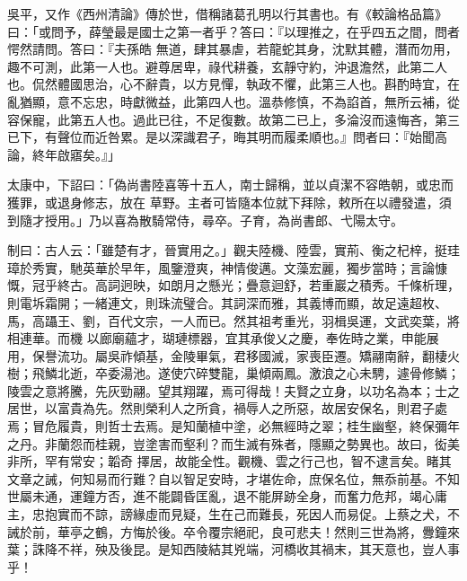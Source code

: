 \begin{pinyinscope}
 吳平，又作《西州清論》傳於世，借稱諸葛孔明以行其書也。有《較論格品篇》曰：「或問予，薛瑩最是國士之第一者乎？答曰：『以理推之，在乎四五之間，問者愕然請問。答曰：『夫孫皓
 無道，肆其暴虐，若龍蛇其身，沈默其體，潛而勿用，趣不可測，此第一人也。避尊居卑，祿代耕養，玄靜守約，沖退澹然，此第二人也。侃然體國思治，心不辭貴，以方見憚，執政不懼，此第三人也。斟酌時宜，在亂猶顯，意不忘忠，時獻微益，此第四人也。溫恭修慎，不為諂首，無所云補，從容保寵，此第五人也。過此已往，不足復數。故第二已上，多淪沒而遠悔吝，第三已下，有聲位而近咎累。是以深識君子，晦其明而履柔順也。』問者曰：『始聞高論，終年啟寤矣。』」



 太康中，下詔曰：「偽尚書陸喜等十五人，南士歸稱，並以貞潔不容皓朝，或忠而獲罪，或退身修志，放在
 草野。主者可皆隨本位就下拜除，敕所在以禮發遣，須到隨才授用。」乃以喜為散騎常侍，尋卒。子育，為尚書郎、弋陽太守。



 制曰：古人云：「雖楚有才，晉實用之。」觀夫陸機、陸雲，實荊、衡之杞梓，挺珪璋於秀實，馳英華於早年，風鑒澄爽，神情俊邁。文藻宏麗，獨步當時；言論慷慨，冠乎終古。高詞迥映，如朗月之懸光；疊意迴舒，若重巖之積秀。千條析理，則電坼霜開；一緒連文，則珠流璧合。其詞深而雅，其義博而顯，故足遠超枚、馬，高躡王、劉，百代文宗，一人而已。然其祖考重光，羽楫吳運，文武奕葉，將相連華。而機
 以廊廟蘊才，瑚璉標器，宜其承俊乂之慶，奉佐時之業，申能展用，保譽流功。屬吳祚傾基，金陵畢氣，君移國滅，家喪臣遷。矯翮南辭，翻棲火樹；飛鱗北逝，卒委湯池。遂使穴碎雙龍，巢傾兩鳳。激浪之心未騁，遽骨修鱗；陵雲之意將騰，先灰勁翮。望其翔躍，焉可得哉！夫賢之立身，以功名為本；士之居世，以富貴為先。然則榮利人之所貪，禍辱人之所惡，故居安保名，則君子處焉；冒危履貴，則哲士去焉。是知蘭植中塗，必無經時之翠；桂生幽壑，終保彌年之丹。非蘭怨而桂親，豈塗害而壑利？而生滅有殊者，隱顯之勢異也。故曰，衒美非所，罕有常安；韜奇
 擇居，故能全性。觀機、雲之行己也，智不逮言矣。睹其文章之誡，何知易而行難？自以智足安時，才堪佐命，庶保名位，無忝前基。不知世屬未通，運鐘方否，進不能闢昏匡亂，退不能屏跡全身，而奮力危邦，竭心庸主，忠抱實而不諒，謗緣虛而見疑，生在己而難長，死因人而易促。上蔡之犬，不誡於前，華亭之鶴，方悔於後。卒令覆宗絕祀，良可悲夫！然則三世為將，釁鐘來葉；誅降不祥，殃及後昆。是知西陵結其兇端，河橋收其禍末，其天意也，豈人事乎！



\end{pinyinscope}